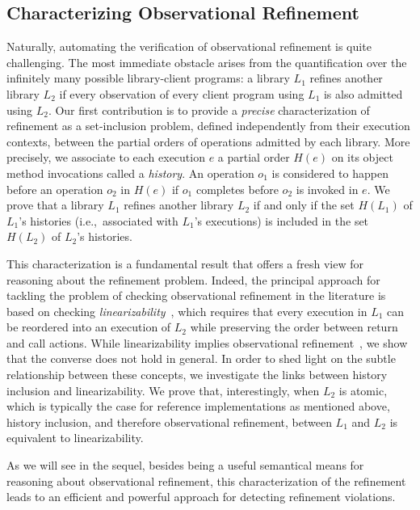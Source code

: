 \subsection{Characterizing Observational Refinement}
\label{sec:intro:histories}

Naturally, automating the verification of observational refinement is quite
challenging. The most immediate obstacle arises from the quantification over
the infinitely many possible library-client programs: a library $L_1$ refines
another library $L_2$ if every observation of every client program using $L_1$
is also admitted using $L_2$. Our first contribution is to provide a
\emph{precise} characterization of refinement as a set-inclusion problem,
defined independently from their execution contexts, between the partial orders
of operations admitted by each library. More precisely, we associate to each
execution $e$ a partial order $H(e)$ on its object method invocations called a
\emph{history}. An operation $o_1$ is considered to happen before an operation
$o_2$ in $H(e)$ if $o_1$ completes before $o_2$ is invoked in $e$. We prove
that a library $L_1$ refines another library $L_2$ if and only if the set
$H(L_1)$ of $L_1$'s histories (i.e.,~associated with $L_1$'s executions) is
included in the set $H(L_2)$ of $L_2$'s histories.

This characterization is a fundamental result that offers a fresh view for
reasoning about the refinement problem. Indeed, the principal approach for
tackling the problem of checking observational refinement in the literature is
based on checking \emph{linearizability}~\cite{journals/toplas/HerlihyW90},
which requires that every execution in $L_1$ can be reordered into an execution
of $L_2$ while preserving the order between return and call actions. While
linearizability implies observational
refinement~\cite{journals/tcs/FilipovicORY10}, we show that the converse does
not hold in general. In order to shed light on the subtle relationship between
these concepts, we investigate the links between history inclusion and
linearizability. We prove that, interestingly, when $L_2$ is atomic, which is
typically the case for reference implementations as mentioned above, history
inclusion, and therefore observational refinement, between $L_1$ and $L_2$ is
equivalent to linearizability.

As we will see in the sequel, besides being a useful semantical means for
reasoning about observational refinement, this characterization of the
refinement leads to an efficient and powerful approach for detecting refinement
violations.

